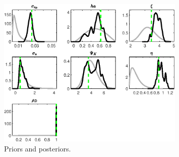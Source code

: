  
\begin{figure}[H]
\centering
\includegraphics[width=0.80\textwidth]{BRS_growth_KPR_D/Output/BRS_growth_KPR_D_PriorsAndPosteriors1}
\caption{Priors and posteriors.}\label{Fig:PriorsAndPosteriors:1}
\end{figure}
 
